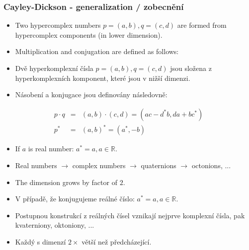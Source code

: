 \begin{frame}\frametitle{Cayley-Dickson - generalization / zobecnění}\scriptsize
\begin{itemize}
  \item Two hypercomplex numbers $p=(a,b),q=(c,d)$ are formed from hypercomplex components (in lower dimension).
	\item Multiplication and conjugation are defined as follows:
\end{itemize} 
\begin{itemize}
	\item Dvě hyperkomplexní čísla $p=(a,b),q=(c,d)$ jsou složena z hyperkomplexních komponent, které jsou v nižší dimenzi.
	\item Násobení a konjugace jsou definovány následovně:
\end{itemize} 

\begin{eqnarray*}
p\cdot q &=& (a,b) \cdot (c,d) = (ac-d^*b,da+bc^*)\\
p^*&=&(a,b)^*=(a^*,-b)
\end{eqnarray*}

\begin{itemize}
 \item If $a$ is real number: $a^*=a, a \in \mathbb{R}.$
 \item Real numbers $\rightarrow$ complex numbers $\rightarrow$ quaternions $\rightarrow$ octonions, ...
 \item The dimension grows by factor of $2$.
\end{itemize} 
\begin{itemize}
 \item V případě, že konjugujeme reálné číslo: $a^*=a, a \in \mathbb{R}.$
 \item Postupnou konstrukcí z reálných čísel vznikají nejprve komplexní čísla, pak kvaterniony, oktoniony, ...
 \item Každý s dimenzí $2\times$ větší než předcházející.
\end{itemize} 
\end{frame}

